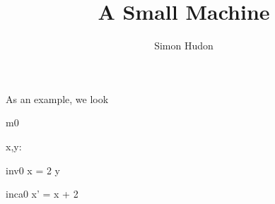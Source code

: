 \documentclass[12pt]{amsart}
\title{A Small Machine}
\author{Simon Hudon}
\date{} %
\begin{document}
\maketitle

As an example, we look

\begin{machine}{m0}

\begin{variable}
	x,y: \Int
\end{variable}


\begin{invariant}{inv0}
	x = 2 \cdot y
\end{invariant}

\begin{evassignment}{inc}{a0}
	x' = x + 2
\end{evassignment}

\end{machine}
\end{document}
